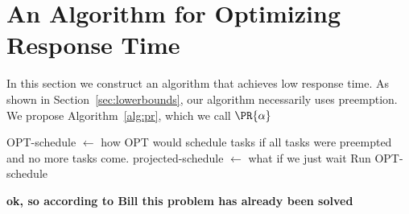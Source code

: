 \section{An Algorithm for Optimizing Response Time}
\label{sec:responsetime}

In this section we construct an algorithm that achieves low
response time. As shown in Section~\ref{sec:lowerbounds}, our
algorithm necessarily uses preemption.
We propose Algorithm~\ref{alg:pr}, which we call $\PR{\alpha}$
\begin{algorithm}
  \caption{$\PR{\alpha}$}
  \label{alg:pr}
  \begin{algorithmic}
      \State OPT-schedule $\gets$ how OPT would schedule tasks if
      all tasks were preempted and no more tasks come.
      \State projected-schedule $\gets$ what if we just wait
        \State Run OPT-schedule
      \EndIf
    \EndWhile
  \end{algorithmic}
\end{algorithm}

\textbf{ok, so according to Bill this problem has already been solved}

